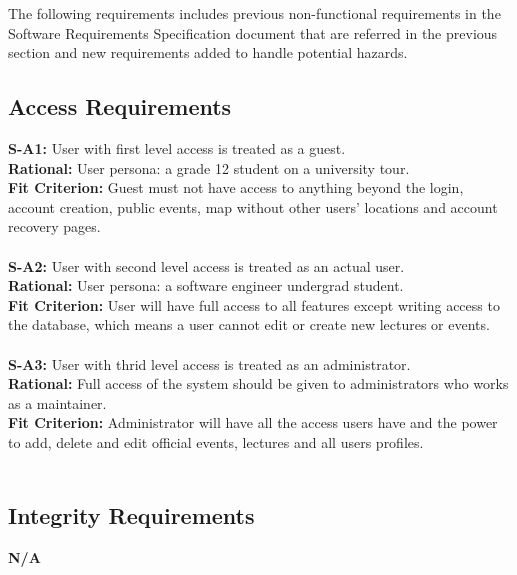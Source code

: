\documentclass{article}
\begin{document}
The following requirements includes previous non-functional requirements in the Software Requirements Specification document that are referred in the previous section and new requirements added to handle potential hazards.

\subsection{Access Requirements}
\textbf{S-A1:} User with first level access is treated as a guest.\\
\textbf{Rational:} User persona: a grade 12 student on a university tour.\\
\textbf{Fit Criterion:} Guest must not have access to anything beyond the login, account creation, public events, map without other users' locations and account recovery pages. \\\\
\textbf{S-A2:} User with second level access is treated as an actual user.\\
\textbf{Rational:} User persona: a software engineer undergrad student.\\
\textbf{Fit Criterion:} User will have full access to all features except writing access to the database, which means a user cannot edit or create new lectures or events. \\\\
\textbf{S-A3:} User with thrid level access is treated as an administrator.\\
\textbf{Rational:} Full access of the system should be given to administrators who works as a maintainer.\\
\textbf{Fit Criterion:} Administrator will have all the access users have and the power to add, delete and edit official events, lectures and all users profiles.\\\\

\subsection{Integrity Requirements}

\textbf{N/A}
\end{document}
